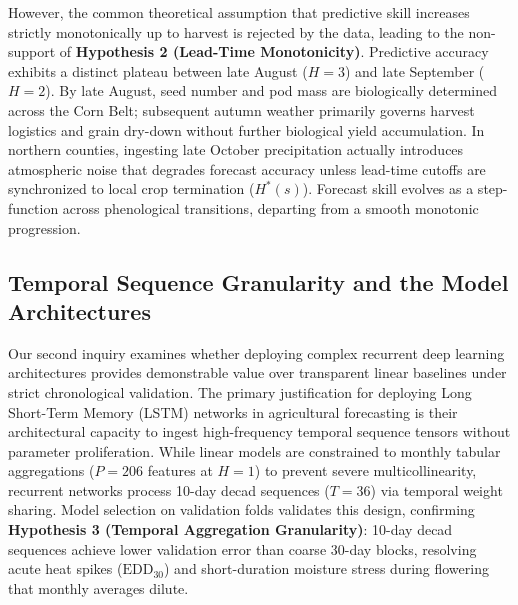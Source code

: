 However, the common theoretical assumption that predictive skill increases strictly monotonically up to harvest is rejected by the data, leading to the non-support of \textbf{Hypothesis 2 (Lead-Time Monotonicity)}. Predictive accuracy exhibits a distinct plateau between late August ($H=3$) and late September ($H=2$). By late August, seed number and pod mass are biologically determined across the Corn Belt; subsequent autumn weather primarily governs harvest logistics and grain dry-down without further biological yield accumulation. In northern counties, ingesting late October precipitation actually introduces atmospheric noise that degrades forecast accuracy unless lead-time cutoffs are synchronized to local crop termination ($H^*(s)$). Forecast skill evolves as a step-function across phenological transitions, departing from a smooth monotonic progression.

\subsection{Temporal Sequence Granularity and the Model Architectures}
Our second inquiry examines whether deploying complex recurrent deep learning architectures provides demonstrable value over transparent linear baselines under strict chronological validation. The primary justification for deploying Long Short-Term Memory (LSTM) networks in agricultural forecasting is their architectural capacity to ingest high-frequency temporal sequence tensors without parameter proliferation. While linear models are constrained to monthly tabular aggregations ($P = 206$ features at $H=1$) to prevent severe multicollinearity, recurrent networks process 10-day decad sequences ($T=36$) via temporal weight sharing. Model selection on validation folds validates this design, confirming \textbf{Hypothesis 3 (Temporal Aggregation Granularity)}: 10-day decad sequences achieve lower validation error than coarse 30-day blocks, resolving acute heat spikes ($\text{EDD}_{30}$) and short-duration moisture stress during flowering that monthly averages dilute.

